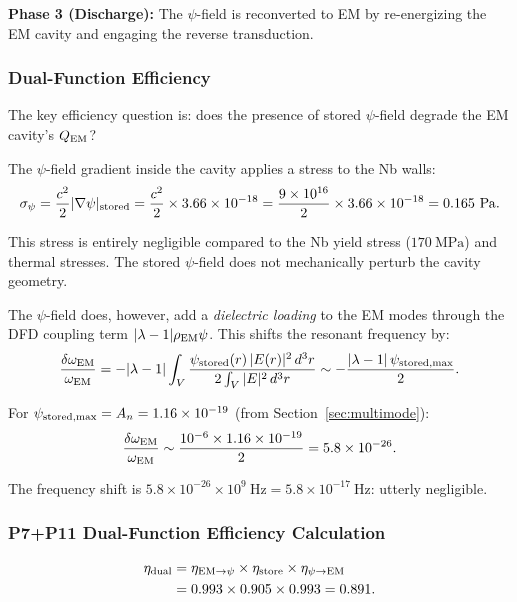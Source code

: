 \documentclass[aps,prd,twocolumn,superscriptaddress]{revtex4-2}
\newcommand{\lam}{|\lambda-1|}
\begin{document}
\textbf{Phase 3 (Discharge):}  The $\psi$-field is reconverted to EM
by re-energizing the EM cavity and engaging the reverse transduction.

\subsubsection{Dual-Function Efficiency}

The key efficiency question is: does the presence of stored $\psi$-field
degrade the EM cavity's $Q_{\rm EM}$?

The $\psi$-field gradient inside the cavity applies a stress to the
Nb walls:
\begin{equation}
\sigma_\psi = \frac{c^2}{2}|\nabla\psi|_{\rm stored}
= \frac{c^2}{2}\times 3.66\times 10^{-18}
= \frac{9\times 10^{16}}{2}\times 3.66\times 10^{-18}
= 0.165~\mathrm{Pa}.
\end{equation}

This stress is entirely negligible compared to the Nb yield stress
($170~\mathrm{MPa}$) and thermal stresses.  The stored $\psi$-field
does not mechanically perturb the cavity geometry.

The $\psi$-field does, however, add a \emph{dielectric loading} to
the EM modes through the DFD coupling term $\lam\rho_{\rm EM}\psi$.
This shifts the resonant frequency by:
\begin{equation}
\frac{\delta\omega_{\rm EM}}{\omega_{\rm EM}}
= -\lam\int_V\frac{\psi_{\rm stored}(r)\,|E(r)|^2\,d^3r}
{2\int_V|E|^2\,d^3r}
\sim -\frac{\lam\,\psi_{\rm stored,max}}{2}.
\end{equation}

For $\psi_{\rm stored,max} = A_n = 1.16\times 10^{-19}$ (from Section~\ref{sec:multimode}):
\begin{equation}
\frac{\delta\omega_{\rm EM}}{\omega_{\rm EM}}
\sim \frac{10^{-6}\times 1.16\times 10^{-19}}{2}
= 5.8\times 10^{-26}.
\end{equation}

The frequency shift is $5.8\times 10^{-26}\times 10^9~\mathrm{Hz}
= 5.8\times 10^{-17}~\mathrm{Hz}$: utterly negligible.

\subsubsection{P7+P11 Dual-Function Efficiency Calculation}

\begin{align}
\eta_{\rm dual} &= \eta_{\rm EM\to\psi}\times\eta_{\rm store}\times\eta_{\rm \psi\to EM} \notag\\
&= 0.993\times 0.905\times 0.993 = 0.891.
\end{align}
\end{document}
